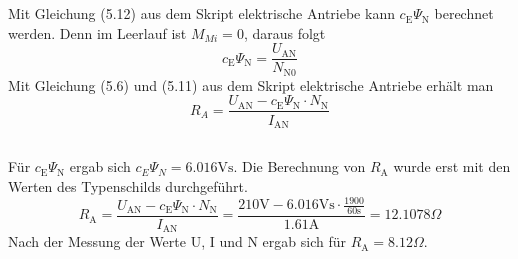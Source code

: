 \chapter{}\label{ex:aufg3}
%
\section{}\label{sec:aufg3a}
Mit Gleichung (5.12) aus dem Skript elektrische Antriebe kann $c_\text{E} \Psi_\text{N}$ berechnet werden. Denn im Leerlauf ist $M_{Mi} = 0$, daraus folgt
\begin{equation}
c_\text{E} \Psi_\text{N} = \frac{U_{\text{AN}}}{N_{\text{N}0}}
\end{equation} 
Mit Gleichung (5.6) und (5.11) aus dem Skript elektrische Antriebe erhält man
\begin{equation}
R_A = \frac{U_{\text{AN}} - c_\text{E} \Psi_\text{N} \cdot N_\text{N}}{I_{\text{AN}}}
\end{equation} 

\section{}\label{sec:aufg3b}
%
Für $c_\text{E} \Psi_\text{N}$ ergab sich $c_E \Psi_N = 6.016 \text{Vs}$.
Die Berechnung von $R_\text{A}$ wurde erst mit den Werten des Typenschilds durchgeführt.
\begin{equation}
R_\text{A} = \frac{U_{\text{AN}} - c_\text{E} \Psi_\text{N} \cdot N_\text{N}}{I_{\text{AN}}} = \frac{210 \text{V} - 6.016\text{Vs} \cdot \frac{1900}{60\text{s}}}{1.61\text{A}} = 12.1078 \Omega
\end{equation}
Nach der Messung der Werte U, I und N ergab sich für $R_\text{A} = 8.12\Omega$.

\clearpage